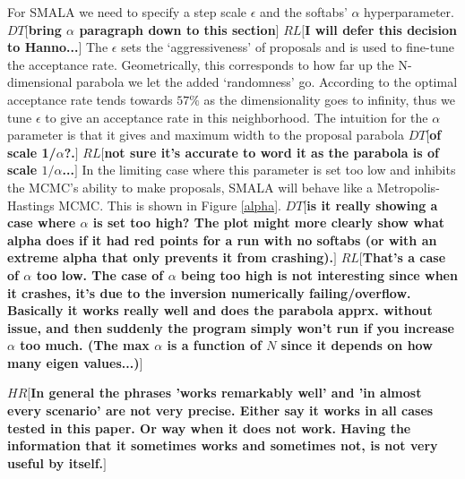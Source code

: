 \documentclass{aa}
\def\memohr#1{\color{blue}$HR[${\bf #1}$]$ \color{black}}
\def\memodt#1{\color{green}$DT[${\bf #1}$]$ \color{black}}
\def\memorl#1{\color{gray}$RL[${\bf #1}$]$ \color{black}}
\begin{document}
 
For SMALA we need to specify a step scale $\epsilon$ and the softabs' $\alpha$ hyperparameter. \memodt{bring $\alpha$ paragraph down to this section} \memorl{I will defer this decision to Hanno...}
The $\epsilon$ sets the `aggressiveness' of proposals and is used to fine-tune the acceptance rate. 
Geometrically, this corresponds to how far up the N-dimensional parabola we let the added `randomness' go. 
According to \cite{robert1998} the optimal acceptance rate tends towards $57\%$ as the dimensionality goes to infinity, thus we tune $\epsilon$ to give an acceptance rate in this neighborhood. 
The intuition for the $\alpha$ parameter is that it gives and maximum width to the proposal parabola \memodt{of scale 1/$\alpha$?.} \memorl{not sure it's accurate to word it as the parabola is of scale $1/\alpha$...}
In the limiting case where this parameter is set too low and inhibits the MCMC's ability to make proposals, SMALA will behave like a Metropolis-Hastings MCMC. 
This is shown in Figure \ref{alpha}. \memodt{is it really showing a case where $\alpha$ is set too high? The plot might more clearly show what alpha does if it had red points for a run with no softabs (or with an extreme alpha that only prevents it from crashing).} 
\memorl{That's a case of $\alpha$ too low. The case of $\alpha$ being too high is not interesting since when it crashes, it's due to the inversion numerically failing/overflow. Basically it works really well and does the parabola apprx. without issue, and then suddenly the program simply won't run if you increase $\alpha$ too much. (The max $\alpha$ is a function of $N$ since it depends on how many eigen values...)}

\memohr{In general the phrases 'works remarkably well' and 'in almost every scenario' are not very precise. Either say it works in all cases tested in this paper. Or way when it does not work. Having the information that it sometimes works and sometimes not, is not very useful by itself.}
\end{document}
